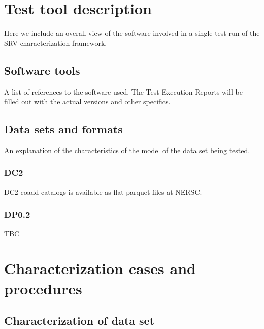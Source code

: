 \documentclass[12pt, a4paper]{article}
\begin{document}

\section{Test tool description}

Here we include an overall view of the software involved in a single test run of the SRV characterization framework.

\subsection{Software tools}

A list of references to the software used. The Test Execution Reports will be filled out with the actual versions and other specifics.

\subsection{Data sets and formats}

An explanation of the characteristics of the model of the data set being tested.

\subsubsection{DC2}

DC2 coadd catalogs is available as flat parquet files at NERSC.

\subsubsection{DP0.2}

TBC


\section{Characterization cases and procedures}

\subsection{Characterization of data set}
\end{document}
